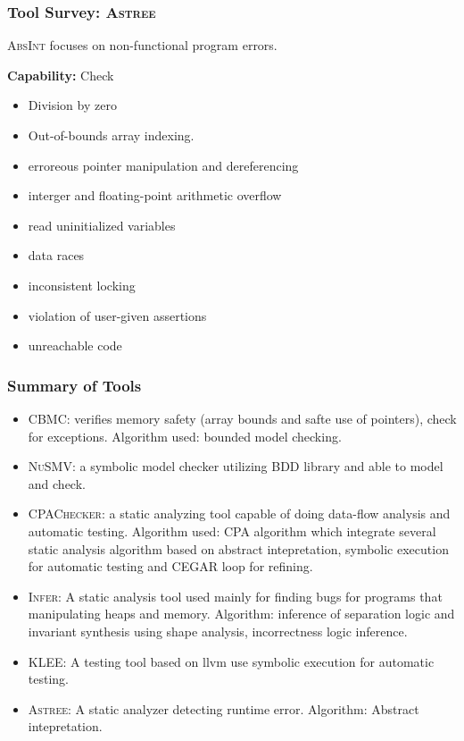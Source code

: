 \documentclass[11pt]{beamer}
\begin{document}
\begin{frame}\frametitle{Tool Survey: \textsc{Astree}}
\textsc{AbsInt} focuses on non-functional program errors.

\textbf{Capability:}
Check
\begin{itemize}
\item Division by zero
\item Out-of-bounds array indexing.
\item erroreous pointer manipulation and dereferencing
\item interger and floating-point arithmetic overflow
\item read uninitialized variables
\item data races
\item inconsistent locking
\item violation of user-given assertions
\item unreachable code
\end{itemize}

\end{frame}
\begin{frame}
\frametitle{Summary of Tools}
\begin{itemize}
\item 
\textsc{CBMC}: verifies memory safety (array bounds and safte use of pointers), check for exceptions. Algorithm used: bounded model checking. 
\item 
\textsc{NuSMV}: a symbolic model checker utilizing BDD library and able to model and check.

\item 
\textsc{CPAChecker}: a static analyzing tool capable of  doing data-flow analysis and automatic testing. Algorithm used: CPA algorithm which integrate several static analysis algorithm based on abstract intepretation, symbolic execution for automatic testing  and CEGAR loop for refining.

\item 
\textsc{Infer}: A static analysis tool used mainly for finding bugs for programs that manipulating heaps and memory. Algorithm: inference of separation logic and invariant synthesis using shape analysis, incorrectness logic inference.

\item 
\textsc{KLEE}: A testing tool based on llvm use symbolic execution for automatic testing.

\item 
\textsc{Astree}: A static analyzer detecting runtime error. Algorithm: Abstract intepretation.


\end{itemize}


\end{frame}
\end{document}
